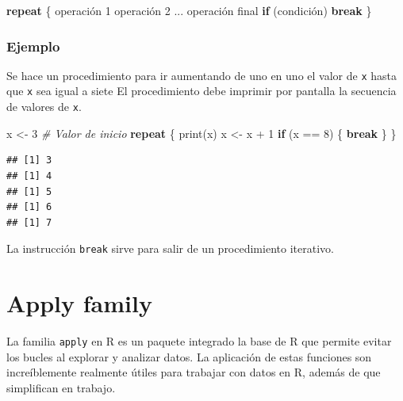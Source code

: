 \documentclass[
]{book}
\makeatletter
\newenvironment{Shaded}{\begin{snugshade}}{\end{snugshade}}
\newcommand{\CommentTok}[1]{\textcolor[rgb]{0.56,0.35,0.01}{\textit{#1}}}
\newcommand{\ControlFlowTok}[1]{\textcolor[rgb]{0.13,0.29,0.53}{\textbf{#1}}}
\newcommand{\DecValTok}[1]{\textcolor[rgb]{0.00,0.00,0.81}{#1}}
\newcommand{\FunctionTok}[1]{\textcolor[rgb]{0.00,0.00,0.00}{#1}}
\newcommand{\NormalTok}[1]{#1}
\newcommand{\OtherTok}[1]{\textcolor[rgb]{0.56,0.35,0.01}{#1}}
\newcommand{\SpecialCharTok}[1]{\textcolor[rgb]{0.00,0.00,0.00}{#1}}
\newenvironment{kframe}{%
\medskip{}
\setlength{\fboxsep}{.8em}
 \def\at@end@of@kframe{}%
 \ifinner\ifhmode%
  \def\at@end@of@kframe{\end{minipage}}%
  \begin{minipage}{\columnwidth}%
 \fi\fi%
 \def\FrameCommand##1{\hskip\@totalleftmargin \hskip-\fboxsep
 \colorbox{shadecolor}{##1}\hskip-\fboxsep
     \hskip-\linewidth \hskip-\@totalleftmargin \hskip\columnwidth}%
 \MakeFramed {\advance\hsize-\width
   \@totalleftmargin\z@ \linewidth\hsize
   \@setminipage}}%
 {\par\unskip\endMakeFramed%
 \at@end@of@kframe}
\newenvironment{rmdblock}[1]
  {
  \begin{itemize}
  \renewcommand{\labelitemi}{
    \raisebox{-.7\height}[0pt][0pt]{
      {\setkeys{Gin}{width=3em,keepaspectratio}\texttt{[image: images/\#1]}}
    }
  }
  \setlength{\fboxsep}{1em}
  \begin{kframe}
  \item
  }
  {
  \end{kframe}
  \end{itemize}
  }
\newenvironment{rmdtip}
  {\begin{rmdblock}{tip}}
  {\end{rmdblock}}
\makeatother
\begin{document}
\begin{Shaded}
\begin{Highlighting}[]
\ControlFlowTok{repeat}\NormalTok{ \{}
\NormalTok{  operación }\DecValTok{1}
\NormalTok{  operación }\DecValTok{2}
\NormalTok{  ...}
\NormalTok{  operación final}
  \ControlFlowTok{if}\NormalTok{ (condición) }\ControlFlowTok{break}
\NormalTok{\}}
\end{Highlighting}
\end{Shaded}

\hypertarget{ejemplo-19}{%
\subsection*{Ejemplo}\label{ejemplo-19}}

Se hace un procedimiento para ir aumentando de uno en uno el valor de \texttt{x} hasta que \texttt{x} sea igual a siete El procedimiento debe imprimir por pantalla la secuencia de valores de \texttt{x}.

\begin{Shaded}
\begin{Highlighting}[]
\NormalTok{x }\OtherTok{\textless{}{-}} \DecValTok{3}  \CommentTok{\# Valor de inicio}
\ControlFlowTok{repeat}\NormalTok{ \{}
   \FunctionTok{print}\NormalTok{(x)}
\NormalTok{   x }\OtherTok{\textless{}{-}}\NormalTok{  x }\SpecialCharTok{+} \DecValTok{1}
   \ControlFlowTok{if}\NormalTok{ (x }\SpecialCharTok{==} \DecValTok{8}\NormalTok{) \{}
     \ControlFlowTok{break}
\NormalTok{   \}}
\NormalTok{\}}
\end{Highlighting}
\end{Shaded}

\begin{verbatim}
## [1] 3
## [1] 4
## [1] 5
## [1] 6
## [1] 7
\end{verbatim}

\begin{rmdtip}
La instrucción \texttt{break} sirve para salir de un procedimiento iterativo.
\end{rmdtip}

\hypertarget{apply-family}{%
\chapter{Apply family}\label{apply-family}}

La familia \texttt{apply} en R es un paquete integrado la base de R que permite evitar los bucles al explorar y analizar datos. La aplicación de estas funciones son increíblemente realmente útiles para trabajar con datos en R, además de que simplifican en trabajo.
\end{document}

